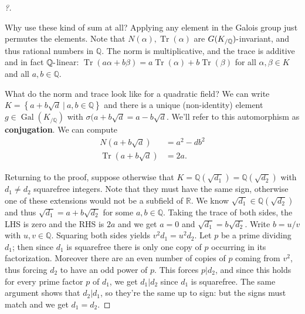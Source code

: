 \begin{proof}[?]
\begin{definition}
\end{definition}

\begin{remark}

Why use these kind of sum at all? Applying any element in the Galois
group just permutes the elements. Note that
\(N( \alpha), \operatorname{Tr}( \alpha)\) are
\(G(K_{/{\mathbb{Q}}}){\hbox{-}}\)invariant, and thus rational numbers
in \({\mathbb{Q}}\). The norm is multiplicative, and the trace is
additive and in fact \({\mathbb{Q}}{\hbox{-}}\)linear:
\(\operatorname{Tr}(a \alpha + b \beta) = a \operatorname{Tr}( \alpha) + b \operatorname{Tr}( \beta)\)
for all \(\alpha, \beta\in K\) and all \(a,b \in {\mathbb{Q}}\).

\end{remark}

What do the norm and trace look like for a quadratic field? We can write
\(K = \left\{{a + b \sqrt d {~\mathrel{\Big|}~}a,b \in {\mathbb{Q}}}\right\}\)
and there is a unique (non-identity) element
\(g\in \operatorname{Gal}(K_{/{\mathbb{Q}}})\) with
\(\sigma(a + b \sqrt d = a - b \sqrt{d}\). We'll refer to this
automorphism as \textbf{conjugation}. We can compute
\begin{align*}
N(a + b \sqrt{d} ) &= a^2 - db^2 \\
\operatorname{Tr}(a + b \sqrt{d} ) &= 2a
.\end{align*}

Returning to the proof, suppose otherwise that
\(K = {\mathbb{Q}}(\sqrt{d_1} ) = {\mathbb{Q}}( \sqrt{d_2} )\) with
\(d_1\neq d_2\) squarefree integers. Note that they must have the same
sign, otherwise one of these extensions would not be a subfield of
\({\mathbb{R}}\). We know \(\sqrt{d_1} \in {\mathbb{Q}}( \sqrt{d_2} )\)
and thus \(\sqrt{d_1} = a + b \sqrt{d_2}\) for some
\(a, b\in {\mathbb{Q}}\). Taking the trace of both sides, the LHS is
zero and the RHS is \(2a\) and we get \(a=0\) and
\(\sqrt{d_1} = b \sqrt{d_2}\). Write \(b = u/v\) with
\(u,v\in {\mathbb{Q}}\). Squaring both sides yields
\(v^2 d_1 = u^2 d_2\). Let \(p\) be a prime dividing \(d_1\); then since
\(d_1\) is squarefree there is only one copy of \(p\) occurring in its
factorization. Moreover there are an even number of copies of \(p\)
coming from \(v^2\), thus forcing \(d_2\) to have an odd power of \(p\).
This forces \(p\mathrel{\Big|}d_2\), and since this holds for every
prime factor \(p\) of \(d_1\), we get \(d_1 \mathrel{\Big|}d_2\) since
\(d_1\) is squarefree. The same argument shows that
\(d_2 \mathrel{\Big|}d_1\), so they're the same up to sign: but the
signs must match and we get \(d_1 = d_2\).

\end{proof}

